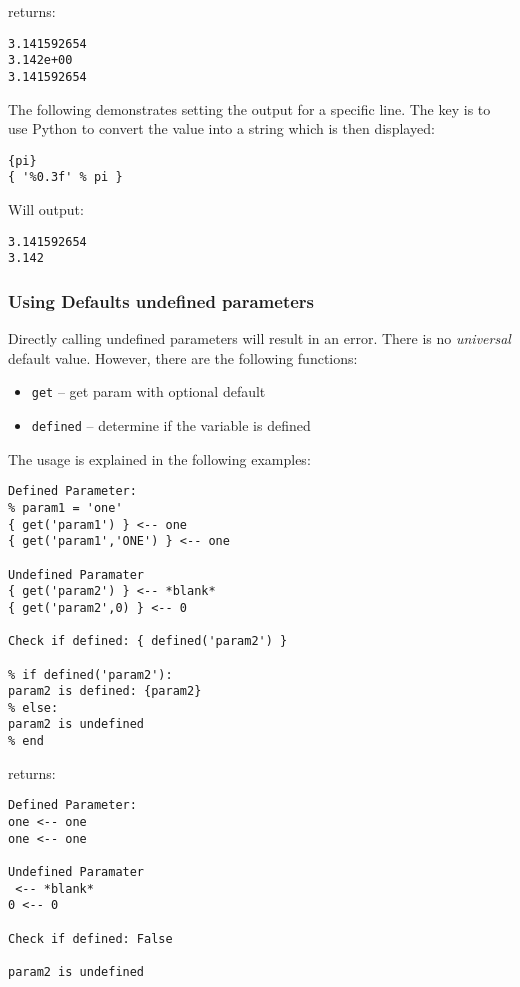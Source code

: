 returns:

\begin{verbatim}
3.141592654
3.142e+00
3.141592654
\end{verbatim}

\label{aside-set-output-format-individually}

The following demonstrates setting the output for a specific line. The
key is to use Python to convert the value into a string which is then
displayed:

\begin{verbatim}
{pi}
{ '%0.3f' % pi }
\end{verbatim}

Will output:

\begin{verbatim}
3.141592654
3.142
\end{verbatim}

\subsubsection{Using Defaults undefined
parameters}\label{using-defaults-undefined-parameters}

Directly calling undefined parameters will result in an error. There is
no \emph{universal} default value. However, there are the following
functions:

\begin{itemize}
\tightlist
\item
  \texttt{get} -- get param with optional default
\item
  \texttt{defined} -- determine if the variable is defined
\end{itemize}

The usage is explained in the following examples:

\begin{verbatim}
Defined Parameter:
% param1 = 'one'
{ get('param1') } <-- one
{ get('param1','ONE') } <-- one

Undefined Paramater
{ get('param2') } <-- *blank*
{ get('param2',0) } <-- 0

Check if defined: { defined('param2') }

% if defined('param2'):
param2 is defined: {param2}
% else:
param2 is undefined
% end
\end{verbatim}

returns:

\begin{verbatim}
Defined Parameter:
one <-- one
one <-- one

Undefined Paramater
 <-- *blank*
0 <-- 0

Check if defined: False

param2 is undefined
\end{verbatim}

